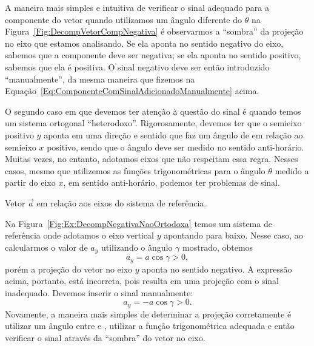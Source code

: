 A maneira mais simples e intuitiva de verificar o sinal adequado para a componente do vetor quando utilizamos um ângulo diferente do $\theta$ na Figura~\ref{Fig:DecompVetorCompNegativa} é observarmos a ``sombra'' da projeção no eixo que estamos analisando. Se ela aponta no sentido negativo do eixo, sabemos que a componente deve ser negativa; se ela aponta no sentido positivo, sabemos que ela é positiva. O sinal negativo deve ser então introduzido ``manualmente'', da mesma maneira que fizemos na Equação~\eqref{Eq:ComponenteComSinalAdicionadoManualmente} acima.

O segundo caso em que devemos ter atenção à questão do sinal é quando temos um sistema ortogonal ``heterodoxo''. Rigorosamente, devemos ter que o semieixo positivo $y$ aponta em uma direção e sentido que faz um ângulo de  em relação ao semieixo $x$ positivo, sendo que o ângulo deve ser medido no sentido anti-horário. Muitas vezes, no entanto, adotamos eixos que não respeitam essa regra. Nesses casos, mesmo que utilizemos as funções trigonométricas para o ângulo $\theta$ medido a partir do eixo $x$, em sentido anti-horário, podemos ter problemas de sinal. 

\begin{marginfigure}
\centering
{}
\caption{Vetor $\vec{a}$ em relação aos eixos do sistema de referência. \label{Fig:Ex:DecompNegativaNaoOrtodoxa}}
\end{marginfigure}

Na Figura~\ref{Fig:Ex:DecompNegativaNaoOrtodoxa} temos um sistema de referência onde adotamos o eixo vertical $y$ apontando para baixo. Nesse caso, ao calcularmos o valor de $a_y$ utilizando o ângulo $\gamma$ mostrado, obtemos
\begin{equation}
    a_y = a \cos\gamma > 0,
\end{equation}
%
porém a projeção do vetor no eixo $y$ aponta no sentido negativo. A expressão acima, portanto, está incorreta, pois resulta em uma projeção com o sinal inadequado. Devemos inserir o sinal manualmente:
\begin{equation}
    a_y = -a \cos\gamma > 0.
\end{equation}
%
Novamente, a maneira mais simples de determinar a projeção corretamente é utilizar um ângulo entre  e , utilizar a função trigonométrica adequada e então verificar o sinal através da ``sombra'' do vetor no eixo.



